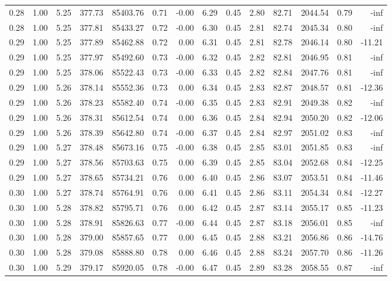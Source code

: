\begin{table}[!ht]
\begin{tabular}{rrrrrrrrrrrrrr}
0.28 & 1.00 & 5.25 & 377.73 & 85403.76 & 0.71 & -0.00 & 6.29 & 0.45 & 2.80 & 82.71 & 2044.54 & 0.79 & -inf \\
0.28 & 1.00 & 5.25 & 377.81 & 85433.27 & 0.72 & -0.00 & 6.30 & 0.45 & 2.81 & 82.74 & 2045.34 & 0.80 & -inf \\
0.29 & 1.00 & 5.25 & 377.89 & 85462.88 & 0.72 & 0.00 & 6.31 & 0.45 & 2.81 & 82.78 & 2046.14 & 0.80 & -11.21 \\
0.29 & 1.00 & 5.25 & 377.97 & 85492.60 & 0.73 & -0.00 & 6.32 & 0.45 & 2.82 & 82.81 & 2046.95 & 0.81 & -inf \\
0.29 & 1.00 & 5.25 & 378.06 & 85522.43 & 0.73 & -0.00 & 6.33 & 0.45 & 2.82 & 82.84 & 2047.76 & 0.81 & -inf \\
0.29 & 1.00 & 5.26 & 378.14 & 85552.36 & 0.73 & 0.00 & 6.34 & 0.45 & 2.83 & 82.87 & 2048.57 & 0.81 & -12.36 \\
0.29 & 1.00 & 5.26 & 378.23 & 85582.40 & 0.74 & -0.00 & 6.35 & 0.45 & 2.83 & 82.91 & 2049.38 & 0.82 & -inf \\
0.29 & 1.00 & 5.26 & 378.31 & 85612.54 & 0.74 & 0.00 & 6.36 & 0.45 & 2.84 & 82.94 & 2050.20 & 0.82 & -12.06 \\
0.29 & 1.00 & 5.26 & 378.39 & 85642.80 & 0.74 & -0.00 & 6.37 & 0.45 & 2.84 & 82.97 & 2051.02 & 0.83 & -inf \\
0.29 & 1.00 & 5.27 & 378.48 & 85673.16 & 0.75 & -0.00 & 6.38 & 0.45 & 2.85 & 83.01 & 2051.85 & 0.83 & -inf \\
0.29 & 1.00 & 5.27 & 378.56 & 85703.63 & 0.75 & 0.00 & 6.39 & 0.45 & 2.85 & 83.04 & 2052.68 & 0.84 & -12.25 \\
0.29 & 1.00 & 5.27 & 378.65 & 85734.21 & 0.76 & 0.00 & 6.40 & 0.45 & 2.86 & 83.07 & 2053.51 & 0.84 & -11.46 \\
0.30 & 1.00 & 5.27 & 378.74 & 85764.91 & 0.76 & 0.00 & 6.41 & 0.45 & 2.86 & 83.11 & 2054.34 & 0.84 & -12.27 \\
0.30 & 1.00 & 5.28 & 378.82 & 85795.71 & 0.76 & 0.00 & 6.42 & 0.45 & 2.87 & 83.14 & 2055.17 & 0.85 & -11.23 \\
0.30 & 1.00 & 5.28 & 378.91 & 85826.63 & 0.77 & -0.00 & 6.44 & 0.45 & 2.87 & 83.18 & 2056.01 & 0.85 & -inf \\
0.30 & 1.00 & 5.28 & 379.00 & 85857.65 & 0.77 & 0.00 & 6.45 & 0.45 & 2.88 & 83.21 & 2056.86 & 0.86 & -14.76 \\
0.30 & 1.00 & 5.28 & 379.08 & 85888.80 & 0.78 & 0.00 & 6.46 & 0.45 & 2.88 & 83.24 & 2057.70 & 0.86 & -11.26 \\
0.30 & 1.00 & 5.29 & 379.17 & 85920.05 & 0.78 & -0.00 & 6.47 & 0.45 & 2.89 & 83.28 & 2058.55 & 0.87 & -inf \\

\end{tabular}
\end{table}
